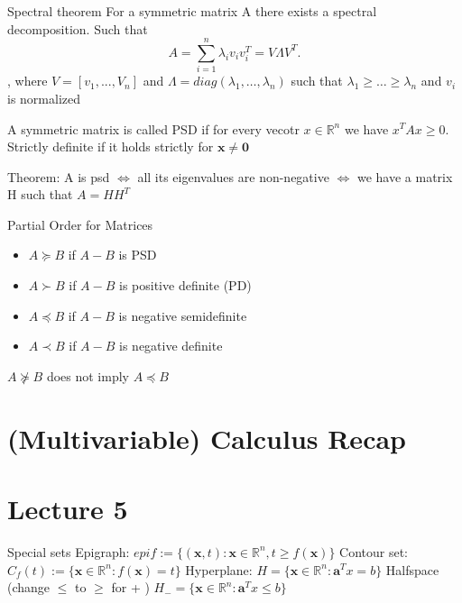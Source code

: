 \documentclass[a4paper]{article}
\begin{document}
\begin{mainbox}{Spectral theorem}
    For a symmetric matrix A there exists a spectral decomposition. Such that \[
    A = \sum_{i=1}^{n} \lambda_i v_i v_i^T = V \Lambda V^T
    .\],
    where $ V= [v_1, ..., V_n]$ and $\Lambda = diag(\lambda_1, \dots, \lambda_n)$ such that $\lambda_1 \geq \dots \geq \lambda_n$ and $v_i$ is normalized 
\end{mainbox}

A symmetric matrix is called PSD if for every vecotr $x\in\mathbb{R}^n$ we have $x^TAx \geq 0$. Strictly definite if it holds strictly for $\mathbf{x} \neq \mathbf{0}$   

Theorem:
A is psd $\Leftrightarrow $ all its eigenvalues are non-negative $\Leftrightarrow$ we have a matrix H such that $A=HH^T$  

\begin{subbox}{Partial Order for Matrices}
    \begin{itemize}
        \item $A \succeq B$ if $A-B$ is PSD
        \item $A\succ B$ if $A-B$ is positive definite (PD)
        \item $A\preceq B$ if $A-B$ is negative semidefinite
        \item $A \prec B$ if $A-B$ is negative definite      
    \end{itemize}
    $A\nsucceq  B$ does not imply $A \preceq B$ 
    
\end{subbox}




\section{(Multivariable) Calculus Recap}
\section*{Lecture 5}
\begin{subbox}{Special sets}
    Epigraph:
$
    epi f := \{(\mathbf{x},t): \mathbf{x} \in \mathbb{R}^n, t \geq f(\mathbf{x})\}
     $\newline
    Contour set:
    $
    C_f(t) := \{\mathbf{x}\in \mathbb{R}^n: f(\mathbf{x}) = t\}
      $\newline
    Hyperplane:
    $
    H = \{\mathbf{x} \in \mathbb{R}^n: \mathbf{a}^Tx = b \} 
    $\newline
    Halfspace (change $\leq$ to $\geq$ for +  )
    $H_- = \{\mathbf{x} \in \mathbb{R}^n: \mathbf{a}^Tx \leq b \} 
    $\newline


\end{subbox}
\end{document}
